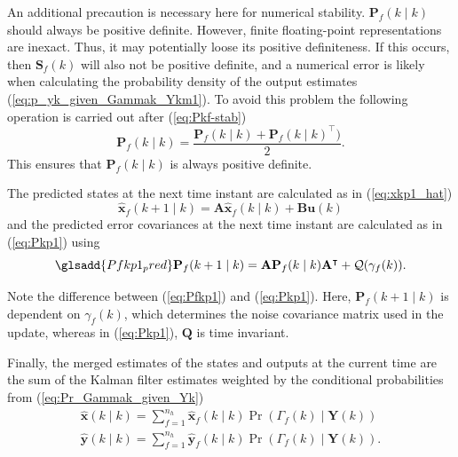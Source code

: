 An additional precaution is necessary here for numerical stability. $\mathbf{P}_f(k \mid k)$ should always be positive definite. However, finite floating-point representations are inexact. Thus, it may potentially loose its positive definiteness. If this occurs, then $\mathbf{S}_f(k)$ will also not be positive definite, and a numerical error is likely when calculating the probability density of the output estimates (\ref{eq:p_yk_given_Gammak_Ykm1}). To avoid this problem the following operation is carried out after (\ref{eq:Pkf-stab})
\begin{equation} \label{eq:Pkf-psd-fix}
	\mathbf{P}_f(k \mid k) = \frac{ \mathbf{P}_f(k \mid k) + \mathbf{P}_f(k \mid k)^\intercal )}{2}. 
\end{equation}
This ensures that $\mathbf{P}_f(k \mid k)$ is always positive definite.

The predicted states at the next time instant are calculated as in (\ref{eq:xkp1_hat})
\begin{equation} \label{eq:xfkp1_hat}
	\mathbf{\hat{x}}_f(k+1 \mid k) = \mathbf{A} \mathbf{\hat{x}}_f(k \mid k) + \mathbf{B} \mathbf{u}(k)
\end{equation}
and the predicted error covariances at the next time instant are calculated as in (\ref{eq:Pkp1}) using
\begin{equation} \label{eq:Pfkp1} \glsadd{Pfkp1_pred}
	\mathbf{P}_f(k+1 \mid k) = \mathbf{A} \mathbf{P}_f(k \mid k)  \mathbf{A}^\intercal  + \mathcal{Q}(\gamma_f(k)).
\end{equation}

Note the difference between (\ref{eq:Pfkp1}) and (\ref{eq:Pkp1}).  Here, $\mathbf{P}_f(k+1 \mid k)$ is dependent on $\gamma_f(k)$, which determines the noise covariance matrix used in the update, whereas in (\ref{eq:Pkp1}), $\mathbf{Q}$ is time invariant.

Finally, the merged estimates of the states and outputs at the current time are the sum of the Kalman filter estimates weighted by the conditional probabilities from (\ref{eq:Pr_Gammak_given_Yk})
\begin{equation} \label{eq:xkyk_hat_MKF}
	\begin{aligned}
		\mathbf{\hat{x}}(k \mid k) = \sum_{f=1}^{n_h} \mathbf{\hat{x}}_f(k \mid k) \Pr(\Gamma_f(k) \mid \mathbf{Y}(k)) \\
		\mathbf{\hat{y}}(k \mid k) = \sum_{f=1}^{n_h} \mathbf{\hat{y}}_f(k \mid k) \Pr(\Gamma_f(k) \mid \mathbf{Y}(k)).
	\end{aligned}
\end{equation}

